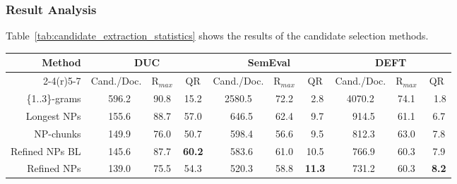     \subsubsection{Result Analysis}
    \label{subsubsec:candidate_extraction_result_analysis}
      Table~\ref{tab:candidate_extraction_statistics} shows the results of the
      candidate selection methods.
      \begin{table*}
        \centering
        \begin{tabular}{@{}r@{~~}c@{~}c@{~~}c@{~}c@{~}c@{~~}c@{~}c@{~}c@{~~}c@{}}
          \toprule
          \multirow{2}{*}[-2pt]{\textbf{Method}} & \multicolumn{3}{c}{\textbf{DUC}} & \multicolumn{3}{c}{\textbf{SemEval}} & \multicolumn{3}{c}{\textbf{DEFT}}\\
          \cmidrule(r){2-4}\cmidrule(r){5-7}\cmidrule{8-10}
          & Cand./Doc. & R$_{max}$ & QR & Cand./Doc. & R$_{max}$ & QR & Cand./Doc. & R$_{max}$ & QR\\
          \midrule
          \{1..3\}-grams & $~~~$596.2 & 90.8 & 15.2 & 2580.5 & 72.2 & $~~$2.8 & 4070.2 & 74.1 & $~~~$1.8\\
          Longest NPs & $~~~$155.6 & 88.7 & 57.0 & $~~~$646.5 & 62.4 & $~~$9.7 & $~~~$914.5 & 61.1 & $~~$6.7\\
          NP-chunks & $~~~$149.9 & 76.0 & 50.7 & $~~~$598.4 & 56.6 & $~~$9.5 & $~~~$812.3 & 63.0 & $~~$7.8\\
          Refined NPs BL & $~~~$145.6 & 87.7 & \textbf{60.2} & $~~~$583.6 & 61.0 & 10.5 & $~~~$766.9 & 60.3 & $~~$7.9\\
          Refined NPs & $~~~$139.0 & 75.5 & 54.3 & $~~~$520.3 & 58.8 & \textbf{11.3} & $~~~$731.2 & 60.3 & \textbf{$~~$8.2}\\
          \bottomrule
        \end{tabular}
        \caption{Candidate selection statistics.
                 \label{tab:candidate_extraction_statistics}}
      \end{table*}

